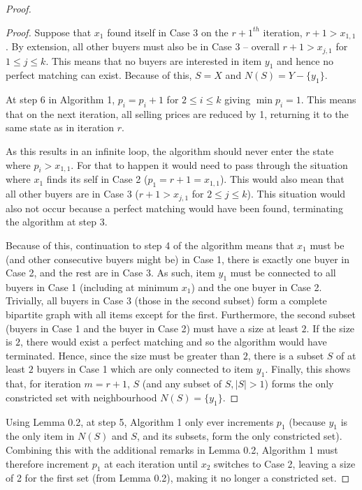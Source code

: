 \begin{enumerate}
\begin{proof}
\begin{proof}
            Suppose that $x_1$ found itself in Case 3 on the ${r + 1}^{th}$ iteration, $r + 1 > x_{1,1}$.
            By extension, all other buyers must also be in Case 3 -- overall $r + 1 > x_{j, 1}$ for $1 \leq j \leq k$.
            This means that no buyers are interested in item $y_1$ and hence no perfect matching can exist.
            Because of this, $S = X$ and $N(S) = Y - \{y_1\}$.

            At step 6 in Algorithm 1, $p_i = p_i + 1$ for $2 \leq i \leq k$ giving $\min{p_i} = 1$.
            This means that on the next iteration, all selling prices are reduced by 1, returning it to the same state as in iteration $r$.
            
            As this results in an infinite loop, the algorithm should never enter the state where $p_i > x_{1,1}$.
            For that to happen it would need to pass through the situation where $x_1$ finds its self in Case 2 ($p_1 = r + 1 = x_{1,1}$).
            This would also mean that all other buyers are in Case 3 ($r + 1 > x_{j, 1}$ for $2 \leq j \leq k$).
            This situation would also not occur because a perfect matching would have been found, terminating the algorithm at step 3.

            Because of this, continuation to step 4 of the algorithm means that $x_1$ must be (and other consecutive buyers might be) in Case 1, there is exactly one buyer in Case 2, and the rest are in Case 3.
            As such, item $y_1$ must be connected to all buyers in Case 1 (including at minimum $x_1$) and the one buyer in Case 2.
            Trivially, all buyers in Case 3 (those in the second subset) form a complete bipartite graph with all items except for the first.
            Furthermore, the second subset (buyers in Case 1 and the buyer in Case 2) must have a size at least $2$.
            If the size is $2$, there would exist a perfect matching and so the algorithm would have terminated.
            Hence, since the size must be greater than $2$, there is a subset $S$ of at least $2$ buyers in Case 1 which are only connected to item $y_1$.
            Finally, this shows that, for iteration $m = r + 1$, $S$ (and any subset of $S, |S| > 1$) forms the only constricted set with neighbourhood $N(S) = \{y_1\}$.
        \end{proof}

        Using Lemma 0.2, at step 5, Algorithm 1 only ever increments $p_1$ (because $y_1$ is the only item in $N(S)$ and $S$, and its subsets, form the only constricted set).
        Combining this with the additional remarks in Lemma 0.2, Algorithm 1 must therefore increment $p_1$ at each iteration until $x_2$ switches to Case 2, leaving a size of 2 for the first set (from Lemma 0.2), making it no longer a constricted set.
        

\end{proof}
\end{enumerate}
